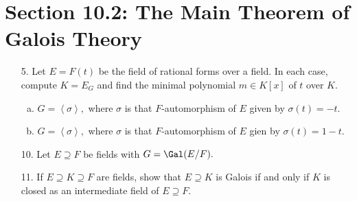 \documentclass{article}
\begin{document}
\section*{Section 10.2: The Main Theorem of Galois Theory}

\begin{itemize}
	\item[5.] Let $E=F(t)$ be the field of rational forms over a field. In each case, compute $K=E_G$ and find the minimal polynomial $m\in K[x]$ of $t$ over $K.$
		\begin{enumerate}[(a)]
			\item $G=\left< \sigma\right>,$ where $\sigma$ is that $F$-automorphism of $E$ given by $\sigma(t)=-t.$

			\item $G=\left< \sigma\right>,$ where $\sigma$ is that $F$-automorphism of $E$ gien by $\sigma(t)=1-t.$
				
		\end{enumerate}

	\item[10.] Let $E\supseteq F$ be fields with $G=\Gal(E/F).$

	\item[11.] If $E\supseteq K\supseteq F$ are fields, show that $E\supseteq K$ is Galois if and only if $K$ is closed as an intermediate field of $E\supseteq F.$
		
\end{itemize}
\end{document}
